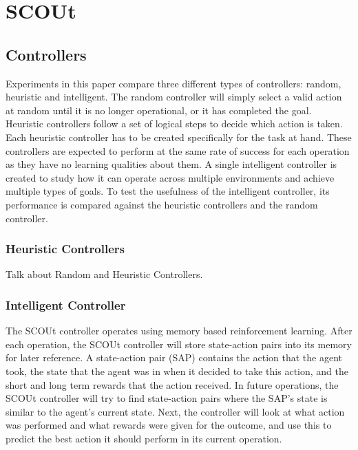 

\chapter{SCOUt}


\section{Controllers} \label{controllers}
Experiments in this paper compare three different types of controllers: random, heuristic and intelligent.
The random controller will simply select a valid action at random until it is no longer operational, or it has completed the goal.
Heuristic controllers follow a set of logical steps to decide which action is taken.
Each heuristic controller has to be created specifically for the task at hand.
These controllers are expected to perform at the same rate of success for each operation as they have no learning qualities about them.
A single intelligent controller is created to study how it can operate across multiple environments and achieve multiple types of goals.
To test the usefulness of the intelligent controller, its performance is compared against the heuristic controllers and the random controller.


\subsection{Heuristic Controllers}
Talk about Random and Heuristic Controllers.


\subsection{Intelligent Controller}
The SCOUt controller operates using memory based reinforcement learning.
After each operation, the SCOUt controller will store state-action pairs into its memory for later reference.
A state-action pair (SAP) contains the action that the agent took, the state that the agent was in when it decided to take this action, and the short and long term rewards that the action received.
In future operations, the SCOUt controller will try to find state-action pairs where the SAP's state is similar to the agent's current state.
Next, the controller will look at what action was performed and what rewards were given for the outcome, and use this to predict the best action it should perform in its current operation.

